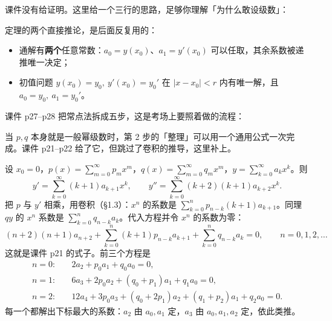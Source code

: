 \documentclass[11pt]{ctexart}
\begin{document}
课件没有给证明。这里给一个三行的思路，足够你理解「为什么敢设级数」：


定理的两个直接推论，是后面反复用的：
\begin{itemize}
  \item 通解有\textbf{两个}任意常数：$a_0=y(x_0)$、$a_1=y'(x_0)$ 可以任取，其余系数被递推唯一决定；
  \item 初值问题 $y(x_0)=y_0,\ y'(x_0)=y_0'$ 在 $|x-x_0|<r$ 内有唯一解，且 $a_0=y_0,\ a_1=y_0'$。
\end{itemize}


课件 p27--p28 把常点法拆成五步，这是考场上要照着做的流程：


当 $p,q$ 本身就是一般幂级数时，第 2 步的「整理」可以用一个通用公式一次完成。课件 p21--p22 给了它，但跳过了卷积的推导，这里补上。

设 $x_0=0$，$p(x)=\sum_{m=0}^\infty p_mx^m$，$q(x)=\sum_{m=0}^\infty q_mx^m$，$y=\sum_{k=0}^\infty a_kx^k$。则
\[
y'=\sum_{k=0}^{\infty}(k+1)a_{k+1}x^k,\qquad
y''=\sum_{k=0}^{\infty}(k+2)(k+1)a_{k+2}x^k .
\]
把 $p$ 与 $y'$ 相乘，用卷积（§1.3）：$x^n$ 的系数是 $\sum_{k=0}^{n}p_{n-k}(k+1)a_{k+1}$。同理 $qy$ 的 $x^n$ 系数是 $\sum_{k=0}^{n}q_{n-k}a_k$。代入方程并令 $x^n$ 的系数为零：
\[
(n+2)(n+1)a_{n+2}+\sum_{k=0}^{n}(k+1)p_{n-k}a_{k+1}+\sum_{k=0}^{n}q_{n-k}a_k=0,
\qquad n=0,1,2,\dots \tag{2.1}
\]
这就是课件 p21 的式子。前三个方程是
\begin{align*}
n=0:\quad & 2a_2+p_0a_1+q_0a_0=0,\\
n=1:\quad & 6a_3+2p_0a_2+(q_0+p_1)a_1+q_1a_0=0,\\
n=2:\quad & 12a_4+3p_0a_3+(q_0+2p_1)a_2+(q_1+p_2)a_1+q_2a_0=0 .
\end{align*}
每一个都解出下标最大的系数：$a_2$ 由 $a_0,a_1$ 定，$a_3$ 由 $a_0,a_1,a_2$ 定，依此类推。
\end{document}
